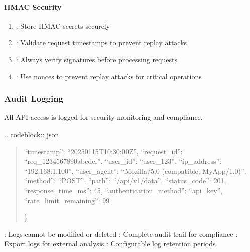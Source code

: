 \documentclass[letterpaper,10pt,english]{sphinxmanual}
\begin{document}
\paragraph{HMAC Security}
\label{\detokenize{api/authentication:hmac-security}}\begin{enumerate}
%
\item {} 
\sphinxAtStartPar
{}: Store HMAC secrets securely

\item {} 
\sphinxAtStartPar
{}: Validate request timestamps to prevent replay attacks

\item {} 
\sphinxAtStartPar
{}: Always verify signatures before processing requests

\item {} 
\sphinxAtStartPar
{}: Use nonces to prevent replay attacks for critical operations

\end{enumerate}


\subsubsection{Audit Logging}
\label{\detokenize{api/authentication:audit-logging}}
\sphinxAtStartPar
All API access is logged for security monitoring and compliance.

\sphinxAtStartPar
{}
.. code\sphinxhyphen{}block:: json
\begin{quote}
\begin{description}
\sphinxlineitem{\{}
\sphinxAtStartPar
“timestamp”: “2025\sphinxhyphen{}01\sphinxhyphen{}15T10:30:00Z”,
“request\_id”: “req\_1234567890abcdef”,
“user\_id”: “user\_123”,
“ip\_address”: “192.168.1.100”,
“user\_agent”: “Mozilla/5.0 (compatible; MyApp/1.0)”,
“method”: “POST”,
“path”: “/api/v1/data”,
“status\_code”: 201,
“response\_time\_ms”: 45,
“authentication\_method”: “api\_key”,
“rate\_limit\_remaining”: 99

\end{description}

\sphinxAtStartPar
\}
\end{quote}

\sphinxAtStartPar
{}
\sphinxhyphen{} : Logs cannot be modified or deleted
\sphinxhyphen{} : Complete audit trail for compliance
\sphinxhyphen{} : Export logs for external analysis
\sphinxhyphen{} : Configurable log retention periods
\end{document}
